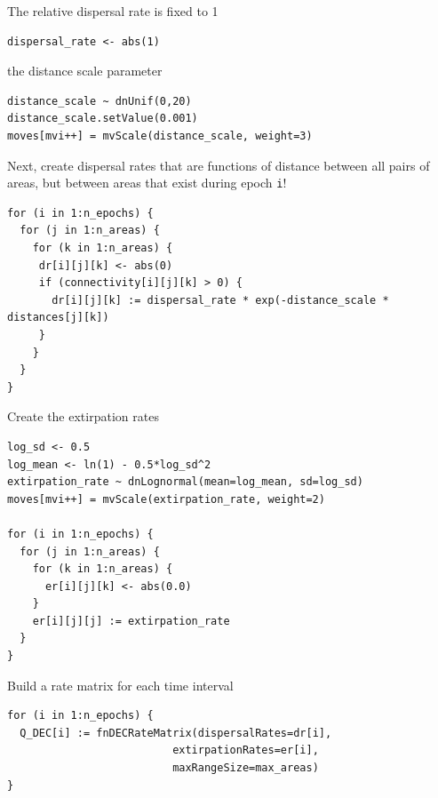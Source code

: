 The relative dispersal rate is fixed to 1
\begin{snugshade}
\begin{lstlisting}
dispersal_rate <- abs(1)
\end{lstlisting}
\end{snugshade}


the distance scale parameter

\begin{snugshade}
\begin{lstlisting}
distance_scale ~ dnUnif(0,20)
distance_scale.setValue(0.001)
moves[mvi++] = mvScale(distance_scale, weight=3)
\end{lstlisting}
\end{snugshade}


Next, create dispersal rates that are functions of distance between all pairs of areas, but between areas that exist during epoch {\tt i}!

\begin{snugshade}
\begin{lstlisting}
for (i in 1:n_epochs) {
  for (j in 1:n_areas) {
    for (k in 1:n_areas) {
     dr[i][j][k] <- abs(0)
     if (connectivity[i][j][k] > 0) {
       dr[i][j][k] := dispersal_rate * exp(-distance_scale * distances[j][k])
     }
    }
  }
}
\end{lstlisting}
\end{snugshade}



Create the extirpation rates

\begin{snugshade}
\begin{lstlisting}
log_sd <- 0.5
log_mean <- ln(1) - 0.5*log_sd^2
extirpation_rate ~ dnLognormal(mean=log_mean, sd=log_sd)
moves[mvi++] = mvScale(extirpation_rate, weight=2)

for (i in 1:n_epochs) {
  for (j in 1:n_areas) {
    for (k in 1:n_areas) {
      er[i][j][k] <- abs(0.0) 
    }
    er[i][j][j] := extirpation_rate
  }
}

\end{lstlisting}
\end{snugshade}


Build a rate matrix for each time interval
\begin{snugshade}
\begin{lstlisting}
for (i in 1:n_epochs) {
  Q_DEC[i] := fnDECRateMatrix(dispersalRates=dr[i],
                          extirpationRates=er[i],
                          maxRangeSize=max_areas)
}
\end{lstlisting}
\end{snugshade}


